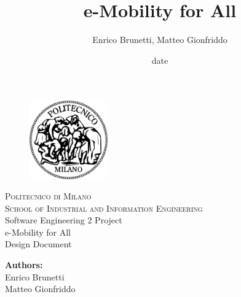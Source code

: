 \documentclass[a4paper]{report}
\begin{document}
\titleformat{\chapter}[hang] 
{\normalfont\huge\bfseries}{\thechapter}{1em}{} 

\title{e-Mobility for All}
\author{Enrico Brunetti, Matteo Gionfriddo}
\date{date} %

\begin{titlepage}
\begin{figure}[t]
\centering
\includegraphics[width=0.3\textwidth]{Logo}
\end{figure}
\begin{center}
    \textsc{ \LARGE{Politecnico di Milano \\}}
	\textsc{ \Large {School of Industrial and Information Engineering\\ }}
	\vspace{3mm}
	\textnormal{ \Large{Software Engineering 2 Project\\}}
	\vspace{30mm}
	\fontsize{10mm}{7mm}\selectfont 
    \textup{e-Mobility for All}\\
    \textnormal{ \LARGE{Design Document\\}}
\end{center}

\vspace{18mm}

\begin{center}
    \textnormal{\large{\bf Authors:\\}}
	{\large Enrico Brunetti \\ Matteo Gionfriddo }
	\fontsize{10mm}{5mm}\selectfont 
\end{center}
\vspace{15mm}


\end{titlepage}
\end{document}
